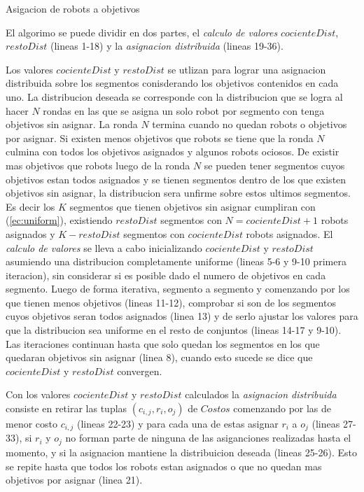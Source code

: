 \begin{algorithm}[H]
 \caption{Asigacion de robots a objetivos}
 \label{alg:resolucionsubastasegmentos}
\end{algorithm}

El algorimo se puede dividir en dos partes, el \emph{calculo de valores}
$cocienteDist$, $restoDist$ (lineas 1-18) y la \emph{asignacion distribuida} (lineas
19-36). 

Los valores $cocienteDist$ y $restoDist$ se utlizan para lograr una asignacion
distribuida sobre los segmentos conisderando los objetivos contenidos en cada
uno. La distribucion deseada se corresponde con la distribucion que se logra al
hacer $N$ rondas en las que se asigna un solo robot por segmento con tenga
objetivos sin asignar. La ronda $N$ termina cuando no quedan robots o objetivos
por asignar. Si existen menos objetivos que robots se tiene que la ronda $N$
culmina con todos los objetivos asignados y algunos robots ociosos. De existir
mas objetivos que robots luego de la ronda $N$ se pueden tener segmentos cuyos
objetivos estan todos asignados y se tienen segmentos dentro de los que 
existen objetivos sin asignar, la distribucion sera unfirme sobre estos ultimos
segmentos. Es decir los $K$ segmentos que tienen objetivos sin asignar
cumpliran con (\ref{ec:uniform}), existiendo $restoDist$ segmentos con
$N=cocienteDist+1$ robots asignados y $K-restoDist$ segmentos con
$cocienteDist$ robots asignados. El \emph{calculo de valores} se lleva a cabo
inicializando $cocienteDist$ y $restoDist$ asumiendo una distribucion
completamente uniforme (lineas 5-6 y 9-10 primera iteracion), sin considerar si
es posible dado el numero de objetivos en cada segmento. Luego de forma
iterativa, segmento a segmento y comenzando por los que tienen menos objetivos
(lineas 11-12), comprobar si son de los segmentos cuyos objetivos seran todos
asignados (linea 13) y de serlo ajustar los valores para que la distribucion
sea uniforme en el resto de conjuntos (lineas 14-17 y 9-10). Las iteraciones
continuan hasta que solo quedan los segmentos en los que quedaran objetivos sin
asignar (linea 8), cuando esto sucede se dice que $cocienteDist$ y $restoDist$
convergen.

Con los valores $cocienteDist$ y $restoDist$ calculados la \emph{asignacion
distribuida} consiste en retirar las tuplas $(c_{i,j},r_i,o_j)$ de $Costos$
comenzando por las de menor costo $c_{i,j}$ (lineas 22-23) y para cada una de
estas asignar $r_i$ a $o_j$ (lineas 27-33), si $r_i$ y $o_j$ no forman parte de
ninguna de las asiganciones realizadas hasta el momento, y si la asignacion
mantiene la distribuicion deseada (lineas 25-26). Esto se repite hasta que
todos los robots estan asignados o que no quedan mas objetivos por asignar
(linea 21).

